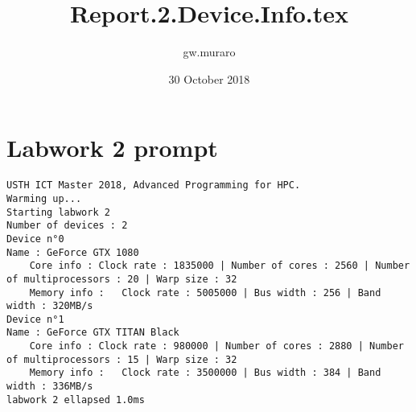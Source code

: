 \documentclass{article}
\title{Report.2.Device.Info.tex}
\author{gw.muraro }
\date{30 October 2018}
\begin{document}
\maketitle

\section{Labwork 2 prompt}

\begin{verbatim}
USTH ICT Master 2018, Advanced Programming for HPC.
Warming up...
Starting labwork 2
Number of devices : 2
Device n°0
Name : GeForce GTX 1080
	Core info : Clock rate : 1835000 | Number of cores : 2560 | Number of multiprocessors : 20 | Warp size : 32
	Memory info : 	Clock rate : 5005000 | Bus width : 256 | Band width : 320MB/s
Device n°1
Name : GeForce GTX TITAN Black
	Core info : Clock rate : 980000 | Number of cores : 2880 | Number of multiprocessors : 15 | Warp size : 32
	Memory info : 	Clock rate : 3500000 | Bus width : 384 | Band width : 336MB/s
labwork 2 ellapsed 1.0ms

\end{verbatim}
\end{document}
